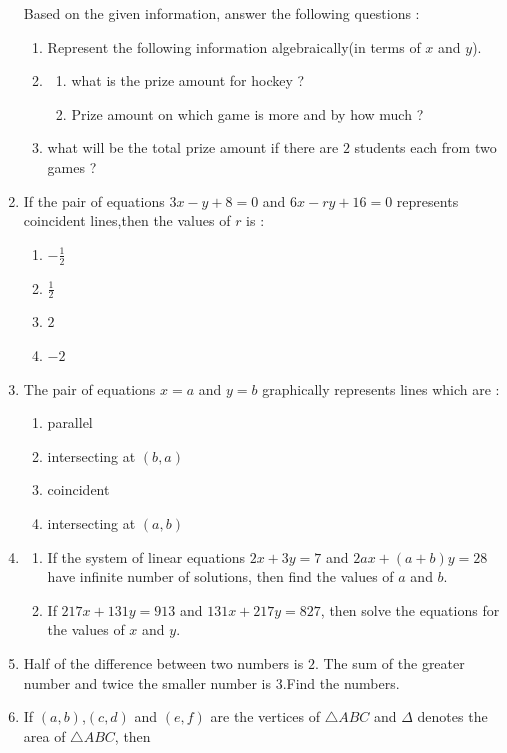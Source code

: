 \documentclass[12pt,-letter paper]{article}
\providecommand{\brak}[1]{\ensuremath{\left(#1\right)}}
\begin{document}
\begin{enumerate}
Based on the given information, answer the following questions :
\begin{enumerate}[label=(\roman*)]
    \item Represent the following information algebraically(in terms of $x$ and $y$).
    \item\begin{enumerate}[label=(\alph*)]
\item what is the prize amount for hockey ?
\item Prize amount on which game is more and by how much ?
    \end{enumerate}
    \item what will be the total prize amount if there are $2$ students each from two games ?
\end{enumerate}
\item If the pair of equations $3x - y + 8 = 0$ and $6x - ry +16 =0$ represents coincident lines,then the values of $r$ is :
\begin{enumerate}[label=(\alph*)]
    \item $-\frac{1}{2}$
    \item $\frac{1}{2}$
    \item $2$
    \item $-2$
\end{enumerate}
\item The pair of equations $x=a$ and $y=b$ graphically represents lines which are :
\begin{enumerate}[label=(\alph*)]
    \item parallel
    \item intersecting at $\brak{b,a}$
    \item coincident
    \item intersecting at $\brak{a,b}$
\end{enumerate}
\item
\begin{enumerate}[label=(\alph*)]
\item If the system of linear equations 
$2x + 3y = 7$  and   $2ax +\brak{a + b}y =28$ 
have infinite number of solutions, then find the values of $a$ and $b$.
\item  If $217x + 131y = 913$ and  
$131x + 217y = 827$,  then solve the equations for the values of $x$ and $y$.
\end{enumerate}
\item Half of the difference between two numbers is $2$. The sum of the greater number and twice the smaller number is $3$.Find the numbers.
\item If \brak{a,b},\brak{c,d} and \brak{e,f} are the vertices of $\triangle ABC$ and $\Delta$ denotes the area of $\triangle ABC$, then 

\end{enumerate}
\end{document}
